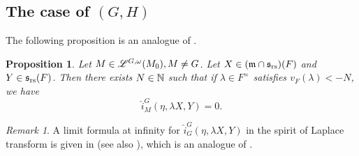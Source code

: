 \documentclass[a4paper]{amsart}
\newcommand{\fm}{{\mathfrak{m}}} \newcommand{\fn}{{\mathfrak{n}}}\newcommand{\fo}{{\mathfrak{o}}} \newcommand{\fp}{{\mathfrak{p}}}
\newtheorem{prop}[thm]{Proposition}
\theoremstyle{definition}
\theoremstyle{remark}
\newtheorem{remark}[thm]{Remark}
\numberwithin{equation}{subsection}
\begin{document}
\subsection{The case of $(G,H)$}

The following proposition is an analogue of \cite[Proposition 2.2]{MR2164623}. 

\begin{prop}\label{limitformula1}
Let $M\in\mathscr{L}^{G, \omega}(M_0), M\neq G$. Let $X\in(\fm\cap\fs_\rs)(F)$ and $Y\in{\mathfrak{s}}_{\mathrm{rs}}(F)$. Then there exists $N\in{\mathbb {N}}$ such that if $\lambda\in F^\times$ satisfies $v_F(\lambda)<-N$, we have
$$ \hat{i}_M^G(\eta, \lambda X, Y)=0. $$
\end{prop}

\begin{remark}
A limit formula at infinity for $\hat{i}_G^G(\eta, \lambda X, Y)$ in the spirit of Laplace transform is given in \cite[Proposition 7.1]{MR3414387} (see also \cite[Proposition 6.4]{MR3299843}), which is an analogue of \cite[Proposition VIII.1]{MR1344131}. 
\end{remark}
\end{document}
